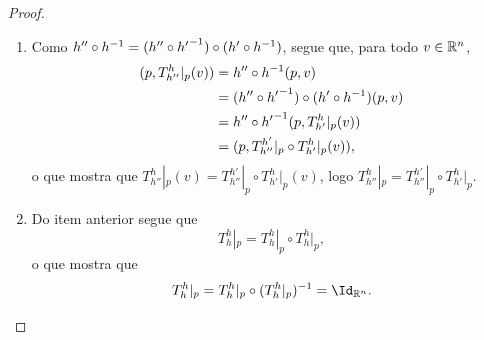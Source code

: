 \begin{proof}
	\begin{enumerate}
	\item Como $h'' \circ h^{-1} = (h'' \circ {h'}^{-1}) \circ (h' \circ h^{-1})$, segue que, para todo $v \in \mathbb{R}^n$,
		\begin{align*}
		(p,T^h_{h''}|_p(v)) &= h'' \circ h^{-1} (p,v) \\
			&= (h'' \circ {h'}^{-1}) \circ (h' \circ h^{-1}) (p,v) \\
			&= h'' \circ {h'}^{-1}(p,T^h_{h'}|_p(v)) \\
			&= (p,T^{h'}_{h''}|_p \circ T^h_{h'}|_p (v)),
		\end{align*}
o que mostra que $T^h_{h''}|_p(v) = T^{h'}_{h''}|_p \circ T^h_{h'}|_p (v)$, logo $T^h_{h''}|_p = T^{h'}_{h''}|_p \circ T^h_{h'}|_p$.

	\item Do item anterior segue que
		\begin{equation*}
		T^h_h|_p = T^h_h|_p \circ T^h_h|_p,
		\end{equation*}
o que mostra que
		\begin{equation*}
		T^h_h|_p = T^h_h|_p \circ (T^h_h|_p)\inv = \Id_{\R^n}.
		\end{equation*}
	

\end{enumerate}
\end{proof}
